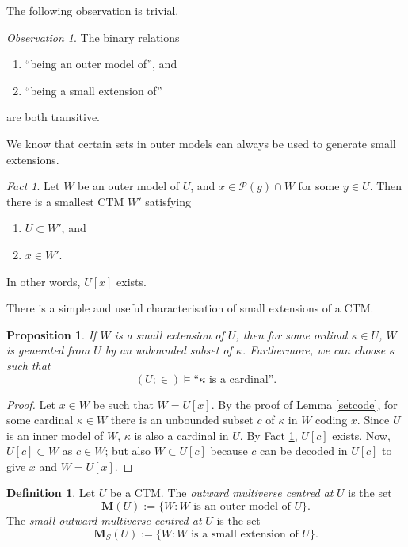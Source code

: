 \documentclass[12pt, twoside]{memoir}
\numberwithin{equation}{section}
\newtheorem{prop}[thm]{Proposition}
\theoremstyle{definition}
\newtheorem{defi}[thm]{Definition}
\theoremstyle{remark}
\newtheorem{ob}[thm]{Observation}
\newtheorem{fact}[thm]{Fact}
\theoremstyle{definition}
\theoremstyle{definition}
\theoremstyle{definition}
\theoremstyle{remark}
\begin{document}
The following observation is trivial.

\begin{ob}
The binary relations 
\begin{enumerate}[label=(\arabic*)]
    \item ``being an outer model of'', and
    \item ``being a small extension of''
\end{enumerate}
are both transitive.
\end{ob}

We know that certain sets in outer models can always be used to generate small extensions.

\begin{fact}\label{fact34}
Let $W$ be an outer model of $U$, and $x \in \mathcal{P}(y) \cap W$ for some $y \in U$. Then there is a smallest CTM $W'$ satisfying
\begin{enumerate}[label=(\alph*)]
    \item $U \subset W'$, and
    \item $x \in W'$.
\end{enumerate}
In other words, $U[x]$ exists.
\end{fact}

There is a simple and useful characterisation of small extensions of a CTM.

\begin{prop}\label{prop35}
If $W$ is a small extension of $U$, then for some ordinal $\kappa \in U$, $W$ is generated from $U$ by an unbounded subset of $\kappa$. Furthermore, we can choose $\kappa$ such that
\begin{equation*}
    (U; \in) \models \text{``} \kappa \text{ is a cardinal''.}
\end{equation*}
\end{prop}

\begin{proof}
Let $x \in W$ be such that $W = U[x]$. By the proof of Lemma \ref{setcode}, for some cardinal $\kappa \in W$ there is an unbounded subset $c$ of $\kappa$ in $W$ coding $x$. Since $U$ is an inner model of $W$, $\kappa$ is also a cardinal in $U$. By Fact \ref{fact34}, $U[c]$ exists. Now, $U[c] \subset W$ as $c \in W$; but also $W \subset U[c]$ because $c$ can be decoded in $U[c]$ to give $x$ and $W = U[x]$.
\end{proof}

\begin{defi}
Let $U$ be a CTM. The \emph{outward multiverse centred at} $U$ is the set
\begin{equation*}
    \mathbf{M}(U) := \{W : W \text{ is an outer model of } U\} \text{.}
\end{equation*}
The \emph{small outward multiverse centred at} $U$ is the set
\begin{equation*}
    \mathbf{M}_{S}(U) := \{W : W \text{ is a small extension of } U\} \text{.}
\end{equation*}
\end{defi}
\end{document}
